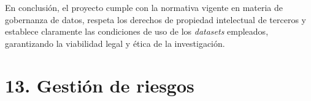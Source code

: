 \documentclass[
11pt, %
]{charter}
\begin{document}
En conclusión, el proyecto cumple con la normativa vigente en materia de gobernanza de datos, respeta los derechos de propiedad intelectual de terceros y establece claramente las condiciones de uso de los \textit{datasets} empleados, garantizando la viabilidad legal y ética de la investigación.


\section{13. Gestión de riesgos}
\label{sec:riesgos}
\end{document}
